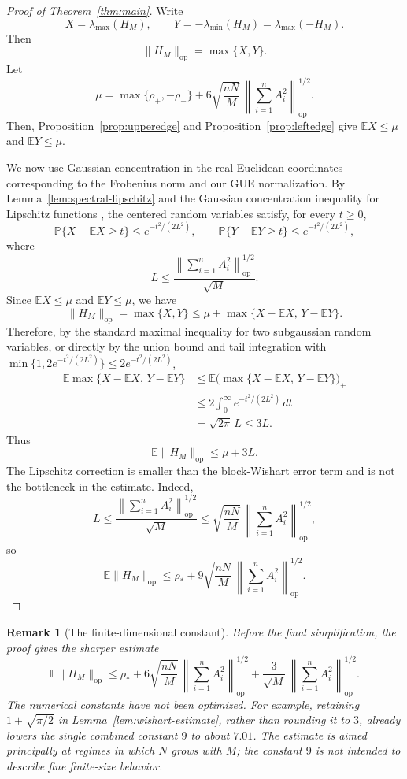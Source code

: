 \documentclass{article}
\newtheorem{remark}[theorem]{Remark}
\newcommand{\E}{\mathbb E}
\newcommand{\op}{\mathrm{op}}
\newcommand{\Arow}{\left\|\sum_{i=1}^n A_i^2\right\|_{\op}^{1/2}}
\begin{document}
\mainthm

\begin{proof}[Proof of Theorem~\ref{thm:main}]
	Write
	\[
		X=\lambda_{\max}(H_M),
		\qquad
		Y=-\lambda_{\min}(H_M)=\lambda_{\max}(-H_M).
	\]
	Then
	\[
		\|H_M\|_{\op}=\max\{X,Y\}.
	\]
	Let
	\[
		\mu=
		\max\{\rho_+,-\rho_-\}
		+
		6\sqrt{\frac{nN}{M}}\,\Arow.
	\]
	Then, Proposition~\ref{prop:upperedge} and
	Proposition~\ref{prop:leftedge} give $\E X\le\mu$ and $\E Y\le\mu$.

	We now use Gaussian concentration in the real Euclidean coordinates
	corresponding to the Frobenius norm and our GUE normalization.
	By Lemma~\ref{lem:spectral-lipschitz} and the Gaussian concentration
	inequality for Lipschitz functions
	\cite[Theorem~5.6]{BoucheronLugosiMassart2013}, the centered random variables
	satisfy, for every $t\ge0$,
	\[
		\mathbb P\{X-\E X\ge t\}\le e^{-t^2/(2L^2)},
		\qquad
		\mathbb P\{Y-\E Y\ge t\}\le e^{-t^2/(2L^2)},
	\]
	where
	\[
		L
		\le
		\frac{\Arow}{\sqrt M}.
	\]
	Since $\E X\le \mu$ and $\E Y\le \mu$, we have
	\[
		\|H_M\|_{\op}
		=
		\max\{X,Y\}
		\le
		\mu+\max\{X-\E X,\,Y-\E Y\}.
	\]
	Therefore, by the standard maximal inequality for two subgaussian random
	variables, or directly by the union bound and tail integration with
	\(\min\{1,2e^{-t^2/(2L^2)}\}\le2e^{-t^2/(2L^2)}\),
	\[
		\begin{aligned}
			\E\max\{X-\E X,\,Y-\E Y\}
			 & \le
			\E\bigl(\max\{X-\E X,\,Y-\E Y\}\bigr)_+ \\
			 & \le
			2\int_0^\infty e^{-t^2/(2L^2)}\,dt      \\
			 & =
			\sqrt{2\pi}\,L
			\le
			3L .
		\end{aligned}
	\]
	Thus
	\[
		\E\|H_M\|_{\op}\le \mu+3L.
	\]
	The Lipschitz correction is smaller than the block-Wishart error term and is not
	the bottleneck in the estimate.  Indeed,
	\[
		L
		\le
		\frac{\Arow}{\sqrt M}
		\le
		\sqrt{\frac{nN}{M}}\,\Arow,
	\]
	so
	\[
		\E\|H_M\|_{\op}
		\le
		\rho_*
		+
		9\sqrt{\frac{nN}{M}}\,\Arow.
	\]
\end{proof}

\begin{remark}[The finite-dimensional constant]
	Before the final simplification, the proof gives the sharper estimate
	\[
		\E\|H_M\|_{\op}
		\le
		\rho_*+
		6\sqrt{\frac{nN}{M}}\,\Arow
		+
		\frac{3}{\sqrt M}\,\Arow.
	\]
	The numerical constants have not been optimized.  For example, retaining
	\(1+\sqrt{\pi/2}\) in Lemma~\ref{lem:wishart-estimate}, rather than rounding
	it to \(3\), already lowers the single combined constant \(9\) to about
	\(7.01\).  The estimate is aimed principally at regimes in which \(N\)
	grows with \(M\); the constant \(9\) is not intended to describe fine
	finite-size behavior.
\end{remark}
\end{document}
